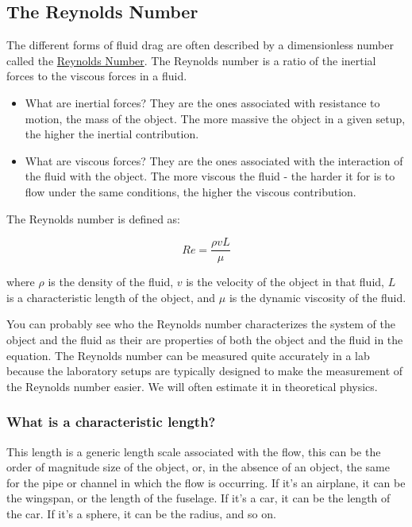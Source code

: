 \documentclass[11pt]{article}
\providecommand{\tightlist}{%
      \setlength{\itemsep}{0pt}\setlength{\parskip}{0pt}}
\begin{document}
    \subsection{The Reynolds Number}\label{the-reynolds-number}

The different forms of fluid drag are often described by a dimensionless
number called the
\href{https://en.wikipedia.org/wiki/Reynolds_number}{Reynolds Number}.
The Reynolds number is a ratio of the inertial forces to the viscous
forces in a fluid.

\begin{itemize}
\tightlist
\item
  What are inertial forces? They are the ones associated with resistance
  to motion, the mass of the object. The more massive the object in a
  given setup, the higher the inertial contribution.
\item
  What are viscous forces? They are the ones associated with the
  interaction of the fluid with the object. The more viscous the fluid -
  the harder it for is to flow under the same conditions, the higher the
  viscous contribution.
\end{itemize}

The Reynolds number is defined as:

\[Re = \frac{\rho v L}{\mu}\]

where \(\rho\) is the density of the fluid, \(v\) is the velocity of the
object in that fluid, \(L\) is a characteristic length of the object,
and \(\mu\) is the dynamic viscosity of the fluid.

You can probably see who the Reynolds number characterizes the system of
the object and the fluid as their are properties of both the object and
the fluid in the equation. The Reynolds number can be measured quite
accurately in a lab because the laboratory setups are typically designed
to make the measurement of the Reynolds number easier. We will often
estimate it in theoretical physics.

\subsubsection{What is a characteristic
length?}\label{what-is-a-characteristic-length}

This length is a generic length scale associated with the flow, this can
be the order of magnitude size of the object, or, in the absence of an
object, the same for the pipe or channel in which the flow is occurring.
If it's an airplane, it can be the wingspan, or the length of the
fuselage. If it's a car, it can be the length of the car. If it's a
sphere, it can be the radius, and so on.
\end{document}
